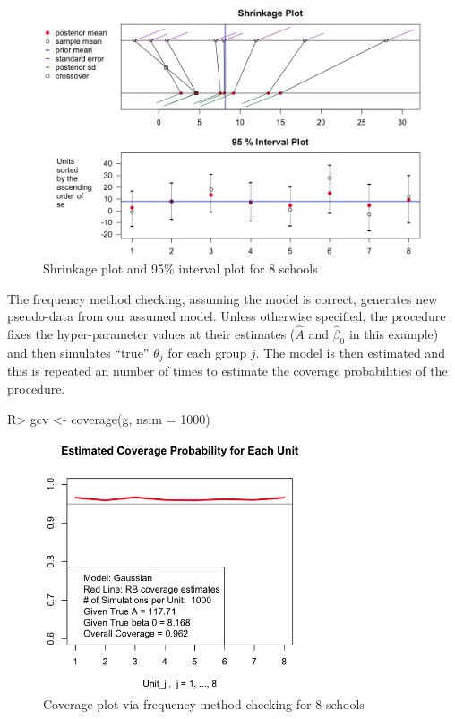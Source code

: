 \documentclass[article]{jss}
\begin{document}
\begin{figure}[h] 
\begin{center}
\includegraphics[width = 6in]{school1.png}
\caption{Shrinkage plot and 95\% interval plot for 8 schools}
\label{fig:8schoolsplot}
\end{center}
\end{figure}


The frequency method checking, assuming the model is correct, generates new pseudo-data from our assumed model. Unless otherwise specified, the procedure fixes the hyper-parameter values at their estimates ($\hat{A}$ and $\hat{\beta}_0$ in this example) and then simulates ``true'' $\theta_j$ for each group $j$. The model is then estimated and this is repeated an  number of times to estimate the coverage probabilities of the procedure.  

\begin{CodeChunk}
\begin{CodeInput}
R> gcv <- coverage(g, nsim = 1000)
\end{CodeInput}
\end{CodeChunk}
\begin{figure}[h] 
\begin{center}
\includegraphics[width = 3in]{school2.png}
\caption{Coverage plot via frequency method checking for 8 schools}
\label{fig:schoolcoverage}
\end{center}
\end{figure}
\end{document}
